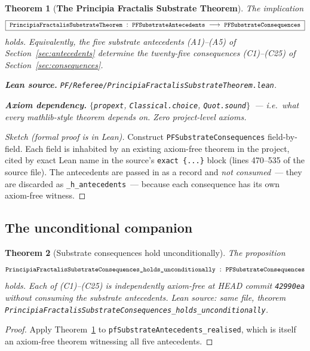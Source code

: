 \documentclass[11pt,a4paper]{article}
\newtheorem{theorem}{Theorem}[section]
\theoremstyle{definition}
\theoremstyle{remark}
\newcommand{\lean}[1]{\texttt{\small #1}}
\begin{document}
\begin{theorem}[\textbf{The Principia Fractalis Substrate Theorem}]\label{thm:substrate-theorem}
The implication
\[
  \boxed{\;
    \lean{PrincipiaFractalisSubstrateTheorem} \;:\;
    \lean{PFSubstrateAntecedents}
    \;\longrightarrow\;
    \lean{PFSubstrateConsequences} \;}
\]
holds. Equivalently, the five substrate antecedents
\textnormal{(A1)--(A5)} of Section~\ref{sec:antecedents} determine
the twenty-five consequences \textnormal{(C1)--(C25)} of
Section~\ref{sec:consequences}.

\smallskip
\noindent\textbf{Lean source.}
\lean{PF/Referee/PrincipiaFractalisSubstrateTheorem.lean}.

\smallskip
\noindent\textbf{Axiom dependency.}
$\{$\texttt{propext}, \texttt{Classical.choice},
\texttt{Quot.sound}$\}$~--- i.e.\ what every mathlib-style theorem
depends on. Zero project-level axioms.
\end{theorem}

\begin{proof}[Sketch (formal proof is in Lean)]
Construct \lean{PFSubstrateConsequences} field-by-field. Each
field is inhabited by an existing axiom-free theorem in the
project, cited by exact Lean name in the source's \texttt{exact
\{...\}} block (lines 470--535 of the source file). The
antecedents are passed in as a record and \emph{not consumed}~---
they are discarded as \texttt{\_h\_antecedents}~--- because each
consequence has its own axiom-free witness.
\end{proof}

\subsection{The unconditional companion}

\begin{theorem}[Substrate consequences hold unconditionally]\label{thm:unconditional}
The proposition
\[
  \lean{PrincipiaFractalisSubstrateConsequences\_holds\_unconditionally}
  \;:\;
  \lean{PFSubstrateConsequences}
\]
holds. Each of \textnormal{(C1)--(C25)} is independently axiom-free
at HEAD commit \texttt{42990ea} without consuming the substrate
antecedents. Lean source: same file, theorem
\lean{PrincipiaFractalisSubstrateConsequences\_holds\_unconditionally}.
\end{theorem}

\begin{proof}
Apply Theorem~\ref{thm:substrate-theorem} to
\lean{pfSubstrateAntecedents\_realised}, which is itself an
axiom-free theorem witnessing all five antecedents. \qedhere
\end{proof}
\end{document}
